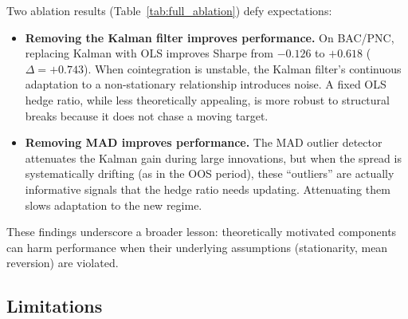 \documentclass{ieeeaccess}
\begin{document}
Two ablation results (Table~\ref{tab:full_ablation}) defy expectations:
\begin{itemize}
    \item \textbf{Removing the Kalman filter improves performance.}
    On BAC/PNC, replacing Kalman with OLS improves Sharpe from $-0.126$ to $+0.618$ ($\Delta = +0.743$).
    When cointegration is unstable, the Kalman filter's continuous adaptation to a non-stationary relationship introduces noise.
    A fixed OLS hedge ratio, while less theoretically appealing, is more robust to structural breaks because it does not chase a moving target.

    \item \textbf{Removing MAD improves performance.}
    The MAD outlier detector attenuates the Kalman gain during large innovations, but when the spread is systematically drifting (as in the OOS period), these ``outliers'' are actually informative signals that the hedge ratio needs updating.
    Attenuating them slows adaptation to the new regime.
\end{itemize}

These findings underscore a broader lesson: theoretically motivated components can harm performance when their underlying assumptions (stationarity, mean reversion) are violated.

\subsection{Limitations}
\end{document}
